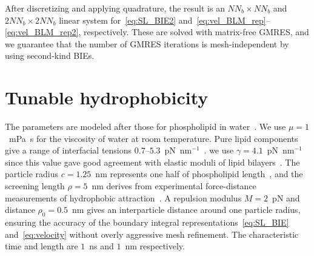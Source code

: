 \documentclass[prb,preprint,showpacs,preprintnumbers,amsmath,amssymb,longbibliography]{revtex4-1}
\renewcommand{\aa}{\mathbf{a}}
\renewcommand{\vv}{\mathbf{v}}
\begin{document}
After discretizing and applying quadrature, the result is an $NN_b
\times NN_b$ and $2NN_b \times 2NN_b$ linear system
for~\eqref{eq:SL_BIE2}
and~\eqref{eq:vel_BLM_rep}--\eqref{eq:vel_BLM_rep2}, respectively.
These are solved with matrix-free GMRES, and we guarantee that the
number of GMRES iterations is mesh-independent by using second-kind
BIEs.




\section{Tunable hydrophobicity}
\label{sec:tunable_hydrophobicity}
The parameters are modeled after those for
phospholipid in water~\cite{Boal}.
We use $\mu = 1$~mPa~s for the viscosity of water
at room temperature. Pure lipid components give a range of interfacial
tensions $0.7$--$5.3$~pN~nm$^{-1}$~\cite{KUZMIN2005, Petelska2012,
  Jackson2016, GarciaSaez}.
we use $\gamma=4.1$~pN~nm$^{-1}$ since
this value gave good agreement with elastic moduli of lipid bilayers~\cite{Fu20,Fu2022_JFM}.
The particle radius $c = 1.25$~nm represents one half 
of phospholipid length~\cite{Boal}, and the screening length $\rho = 5$~nm
derives from experimental force-distance measurements of hydrophobic
attraction~\cite{ErLjCl89,Lietal05,Israelachvili80,Jackson2016}. 
A repulsion modulus $M = 2$~pN and 
distance $\rho_0 = 0.5$~nm gives an interparticle distance around one
particle radius, ensuring the accuracy of the boundary integral
representations~\eqref{eq:SL_BIE} and~\eqref{eq:velocity} without 
overly aggressive mesh refinement. The characteristic time
and length are $1$~ns and  $1$~nm respectively.
\end{document}
